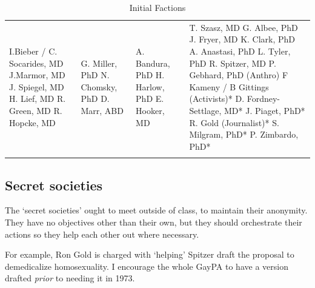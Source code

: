 \begin{refsection}
 \begin{longtable}[!t]{ | P{2.75cm} | P{3cm} | P{3cm} | P{4.25cm} | }
\hline
{} &  &  &  \\ \hline
I.Bieber / C. Socarides, MD \newline
J.Marmor, MD \newline
J. Spiegel, MD \newline
H. Lief, MD \newline
R. Green, MD \newline
R. Hopcke, MD &
G. Miller, PhD \newline
N. Chomsky, PhD \newline
D. Marr, ABD &
A. Bandura, PhD \newline
H. Harlow, PhD \newline
E. Hooker, MD \newline &
T. Szasz, MD\newline
G. Albee, PhD\newline
J. Fryer, MD\newline
K. Clark, PhD\newline
A. Anastasi, PhD\newline
L. Tyler, PhD\newline
R. Spitzer, MD\newline
P. Gebhard, PhD (Anthro)\newline
F Kameny / B Gittings (Activists)*\newline
D. Fordney-Settlage, MD*\newline
J. Piaget, PhD*\newline
R. Gold (Journalist)*\newline
S. Milgram, PhD*\newline
P. Zimbardo, PhD*\newline \\ \hline
\caption{Initial Factions}
\label{table: factions}
\end{longtable}


\subsection{Secret societies}
\label{secretsocieties}

The `secret societies' ought to meet outside of class, to maintain their anonymity. They have no objectives other than their own, but they should orchestrate their actions so they help each other out where necessary.

For example, Ron Gold is charged with `helping' Spitzer draft the proposal to demedicalize homosexuality. I encourage the whole GayPA to have a version drafted \emph{prior} to needing it in 1973.


\end{refsection}
